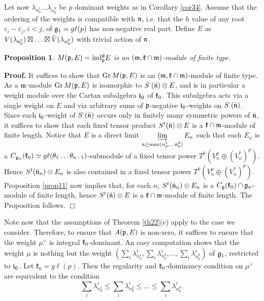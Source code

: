 \documentclass[12pt]{article}
\newcounter{theorem}
\newtheorem{prop}[theo]{Proposition}
\newenvironment{proof}{ \textbf{Proof.}}{$\Box$}
\newcommand{\kk}{\mathfrak{k}}
\newcommand{\pp}{\mathfrak{p}}
\renewcommand{\gg}{\mathfrak{g}}
\newcommand{\refth}[1]{Theorem \ref{#1}}
\newcommand{\refcor}[1]{Corollary \ref{#1}}
\newcommand{\refprop}[1]{Proposition \ref{#1}}
\newcommand{\gl}{{g\ell}}
\newcommand{\ind}{\mathrm{ind}}
\newcommand{\Gr}{\mathrm{Gr}}
\def\ind{\text{\rm ind}}
\begin{document}
Let now $\lambda_{n^{1}_{0}}\ldots \lambda_{n^{p}_{0}}$ be $p$ dominant weights as in \refcor{cor34}.  Assume that the ordering of the weights is compatible with $\frak n$, i.e. that the $h$ value of any root $\varepsilon_i - \varepsilon_j, i < j$, of $\frak g_1 = \gl (p)$ has non-negative real part.  Define $E$ as $V(\lambda_{\frak n^{1}_{0}})\boxtimes\ldots\boxtimes\tilde V(\lambda_{n^{p}_{0}})$ with trivial action of $\frak n$.

\begin{prop}\label{prop35} $M(\frak p, E)=\ind_\pp^\gg E$ is an $(\frak m,\frak k\cap\frak m)$-module of finite type.
\end{prop}

\begin{proof} It suffices to show that $\Gr \, M(\frak p, E)$ is an $(\frak m, \frak k\cap\frak m)$-module of finite type.  As a $\frak m$-module $\Gr \, M(\frak p, E)$ is isomorphic to $S^\cdot (\bar{\frak n})\otimes E$, and is in particular a weight module over the Cartan subalgebra $\frak t_0$ of $\frak k_0$.  This subalgebra acts via a single weight on $E$ and via arbitrary sums of $\frak p$-negative $\frak t_0$-weights on $S^\cdot (\bar{\frak n})$.  Since each $\frak t_0$-weight of $S^\cdot (\bar{\frak n})$ occurs only in finitely many symmetric powers of $\bar{\frak n}$, it suffices to show that each fixed tensor product $S^t(\bar{\frak n})\otimes E$ is a $\frak k\cap\frak m$-module of finite length.  Notice that $E$ is a direct limit $\varinjlim\limits_{\frak n\geq\text{max}(n^{1}_{0},\ldots\frak n^{p}_{0})} E_n$ such that each $E_n$ is a  $C_{\frak g_{n}} (\frak k_0)\simeq \gl (\theta_1\ldots\theta_{n-1})$-submodule of a fixed tensor power $T^k(V^p_n\oplus (V^*_n)^p)$.  Hence $S^t(\bar{\frak n}_{n})\otimes E_n$ is also contained in a fixed tensor power $T^{k} (V^p_n\oplus (V^*_n)^p)$.  \refprop{prop11} now implies that, for each $n$, $S^t(\bar{\frak n}_{n})\otimes E_n$ is a $C_{\frak g} (\frak k_0)\cap\frak g_n$-module of finite length, hence $S^t(\bar{\frak n})\otimes E$ is a $\frak k\cap\frak m$-module of finite length. The Proposition follows.
\end{proof}

Note now that the assumptions of \refth{th22}(e) apply to the case we consider.  Therefore, to ensure that $A(\frak p, E)$ is non-zero, it suffices to ensure that the weight $\mu^{\vee}$ is integral $\frak k_0$-dominant.  An easy computation shows that the weight $\mu$ is nothing but the weight $(\sum\limits_i \lambda^i_{n^{1}_{0}}, \sum\limits_i \lambda^i_{n^{2}_{0}}, \ldots , \sum\limits_i \lambda^i_{n^{p}_{0}})$ of $\frak g_1$, restricted to $\frak t_0$. Let $\kk_0=\gl(p)$. Then the regularity and $\frak k_0$-dominancy condition on $\mu^{\vee}$ are equivalent to the condition
$$
\sum\limits_i \lambda^i_{n^{1}_{0}}\leq \sum\limits_i \lambda^i_{n^{2}_{0}}\leq\ldots\leq \sum\limits_i \lambda^i_{n^{p}_{0}}.
$$
\end{document}
